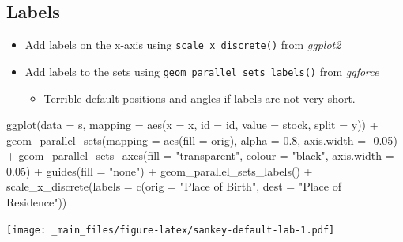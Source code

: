 \documentclass[
]{book}
\newenvironment{Shaded}{\begin{snugshade}}{\end{snugshade}}
\newcommand{\AttributeTok}[1]{\textcolor[rgb]{0.77,0.63,0.00}{#1}}
\newcommand{\FloatTok}[1]{\textcolor[rgb]{0.00,0.00,0.81}{#1}}
\newcommand{\FunctionTok}[1]{\textcolor[rgb]{0.00,0.00,0.00}{#1}}
\newcommand{\NormalTok}[1]{#1}
\newcommand{\SpecialCharTok}[1]{\textcolor[rgb]{0.00,0.00,0.00}{#1}}
\newcommand{\StringTok}[1]{\textcolor[rgb]{0.31,0.60,0.02}{#1}}
\providecommand{\tightlist}{%
  \setlength{\itemsep}{0pt}\setlength{\parskip}{0pt}}
\begin{document}
\hypertarget{labels-7}{%
\subsection{Labels}\label{labels-7}}

\begin{itemize}
\tightlist
\item
  Add labels on the x-axis using \texttt{scale\_x\_discrete()} from \emph{ggplot2}
\item
  Add labels to the sets using \texttt{geom\_parallel\_sets\_labels()} from \emph{ggforce}

  \begin{itemize}
  \tightlist
  \item
    Terrible default positions and angles if labels are not very short.
  \end{itemize}
\end{itemize}

\begin{Shaded}
\begin{Highlighting}[]
\FunctionTok{ggplot}\NormalTok{(}\AttributeTok{data =}\NormalTok{ s, }\AttributeTok{mapping =} \FunctionTok{aes}\NormalTok{(}\AttributeTok{x =}\NormalTok{ x, }\AttributeTok{id =}\NormalTok{ id, }\AttributeTok{value =}\NormalTok{ stock, }\AttributeTok{split =}\NormalTok{ y)) }\SpecialCharTok{+}
  \FunctionTok{geom\_parallel\_sets}\NormalTok{(}\AttributeTok{mapping =} \FunctionTok{aes}\NormalTok{(}\AttributeTok{fill =}\NormalTok{ orig), }\AttributeTok{alpha =} \FloatTok{0.8}\NormalTok{, }\AttributeTok{axis.width =} \SpecialCharTok{{-}}\FloatTok{0.05}\NormalTok{) }\SpecialCharTok{+}
  \FunctionTok{geom\_parallel\_sets\_axes}\NormalTok{(}\AttributeTok{fill =} \StringTok{"transparent"}\NormalTok{, }\AttributeTok{colour =} \StringTok{"black"}\NormalTok{, }
                          \AttributeTok{axis.width =} \FloatTok{0.05}\NormalTok{) }\SpecialCharTok{+}
  \FunctionTok{guides}\NormalTok{(}\AttributeTok{fill =} \StringTok{"none"}\NormalTok{) }\SpecialCharTok{+}
  \FunctionTok{geom\_parallel\_sets\_labels}\NormalTok{() }\SpecialCharTok{+}
  \FunctionTok{scale\_x\_discrete}\NormalTok{(}\AttributeTok{labels =} \FunctionTok{c}\NormalTok{(}\AttributeTok{orig =} \StringTok{"Place of Birth"}\NormalTok{, }
                              \AttributeTok{dest =} \StringTok{"Place of Residence"}\NormalTok{))}
\end{Highlighting}
\end{Shaded}

\texttt{[image: \_main\_files/figure-latex/sankey-default-lab-1.pdf]}
\end{document}
